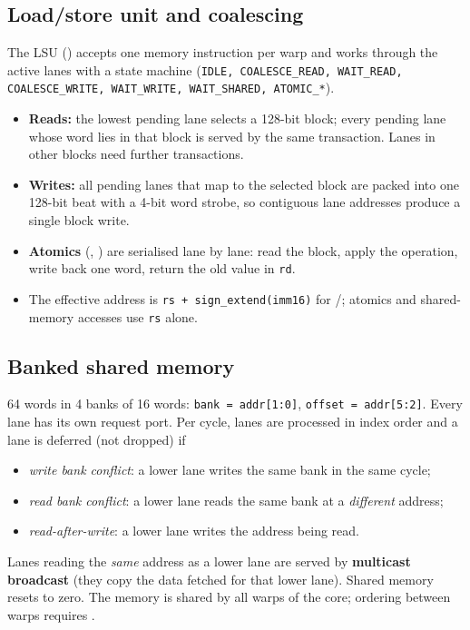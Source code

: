 \documentclass[10pt,a4paper]{report}
\newcommand{\sig}[1]{\texttt{\detokenize{#1}}}
\newcommand{\ins}[1]{\texttt{\detokenize{#1}}}
\begin{document}
\subsection{Load/store unit and coalescing}
The LSU (\sig{lsu.sv}) accepts one memory instruction per warp and works through the active lanes with a state machine
(\texttt{IDLE, COALESCE\_READ, WAIT\_READ, COALESCE\_WRITE, WAIT\_WRITE, WAIT\_SHARED, ATOMIC\_*}).
\begin{itemize}[leftmargin=1.4em,itemsep=1pt]
\item \textbf{Reads:} the lowest pending lane selects a 128-bit block; every pending lane whose word lies in that block is served by the same
 transaction. Lanes in other blocks need further transactions.
\item \textbf{Writes:} all pending lanes that map to the selected block are packed into one 128-bit beat with a 4-bit word strobe,
 so contiguous lane addresses produce a single block write.
\item \textbf{Atomics} (\ins{ATOM_ADD}, \ins{ATOM_CAS}) are serialised lane by lane: read the block, apply the operation, write back one word,
 return the old value in \texttt{rd}.
\item The effective address is \texttt{rs + sign\_extend(imm16)} for \ins{LDR}/\ins{STR}; atomics and shared-memory accesses use \texttt{rs} alone.
\end{itemize}

\subsection{Banked shared memory}
64 words in 4 banks of 16 words: \texttt{bank = addr[1:0]}, \texttt{offset = addr[5:2]}. Every lane has its own request port.
Per cycle, lanes are processed in index order and a lane is deferred (not dropped) if
\begin{itemize}[leftmargin=1.4em,itemsep=1pt]
\item \emph{write bank conflict}: a lower lane writes the same bank in the same cycle;
\item \emph{read bank conflict}: a lower lane reads the same bank at a \emph{different} address;
\item \emph{read-after-write}: a lower lane writes the address being read.
\end{itemize}
Lanes reading the \emph{same} address as a lower lane are served by \textbf{multicast broadcast} (they copy the data fetched for that lower lane).
Shared memory resets to zero. The memory is shared by all warps of the core; ordering between warps requires \ins{SYNC}.
\end{document}
